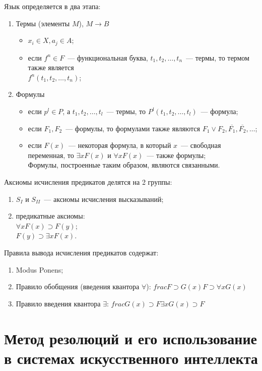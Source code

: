 \documentclass[a4paper,12pt]{report}
\begin{document}
	Язык определяется в два этапа:
	\begin{enumerate}
		\item Термы (элементы $M$), $M \rightarrow B$
			\begin{itemize}
				\item $x_i \in X, a_j \in A$;
				\item если $f^n \in F$~--- функциональная буква, $t_1,t_2,\dots,
					t_n$~--- термы, то термом также является\\$f^n(t_1,t_2,\dots,t_n)$;
			\end{itemize}
		\item Формулы
			\begin{itemize}
				\item если $p^l \in P$, а $t_1,t_2,\dots,t_l$~--- термы, то
					$P^l(t_1,t_2,\dots,t_l)$~--- формула;
				\item если $F_1, F_2$~--- формулы, то формулами также являются
					$F_1 \vee F_2, \overline{F_1}, \overline{F_2},\dots$;
				\item если $F(x)$~--- некоторая формула, в который $x$~---
					свободная переменная, то $\exists x F(x)$ и $\forall x F(x)$~---
					также формулы; \\
					Формулы, построенные таким образом, являются связанными.
			\end{itemize}
	\end{enumerate}

	Аксиомы исчисления предикатов делятся на 2 группы:
	\begin{enumerate}
		\item $S_{I}$ и $S_{II}$~--- аксиомы исчисления высказываний;
		\item предикатные аксиомы:\\
			$\forall x F(x) \supset F(y)$;\\
			$F(y) \supset \exists x F(x)$.
	\end{enumerate}

	Правила вывода исчисления предикатов содержат:
	\begin{enumerate}
		\item Modus Ponens;
		\item Правило обобщения (введения квантора $\forall$):
			$frac{F \supset G(x)}{F \supset \forall x G(x)}$
		\item Правило введения квантора $\exists$:
			$frac{G(x) \supset F}{\exists x G(x) \supset F}$
	\end{enumerate}
\section{Метод резолюций и его использование в системах искусственного
	интеллекта}
\end{document}
